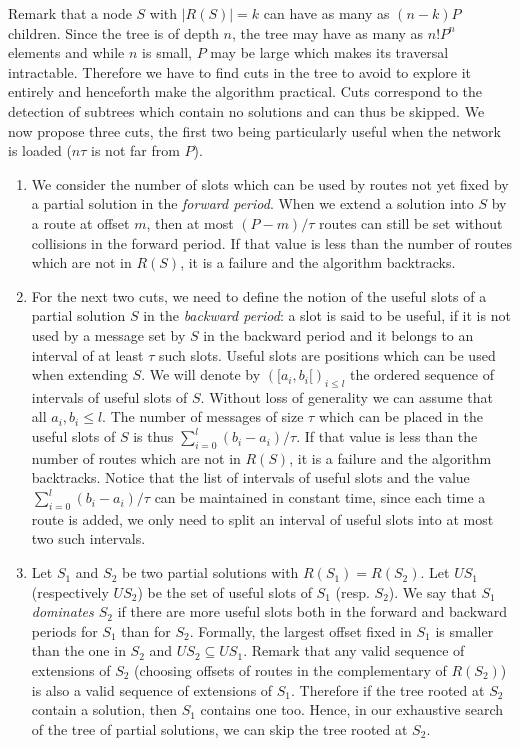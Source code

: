 \documentclass[a4paper,10pt]{article}
\begin{document}
      Remark that a node $S$ with $|R(S)| = k$ can have as many as $(n-k)P$ children. Since the tree is of depth $n$, the tree may have as many as $n!P^n$ elements and while $n$ is small, $P$ may be large which makes its traversal intractable.  Therefore we have to find cuts in the tree to avoid to explore it entirely and henceforth make the algorithm practical. Cuts correspond to the detection of subtrees which contain no solutions and can thus be skipped.   
      We now propose three cuts, the first two being particularly useful when the network is loaded ($n\tau$ is not far from $P$). 
      
      \begin{enumerate}
       \item We consider the number of slots which can be used by routes not yet fixed by a partial solution in the \emph{forward period}. When we extend a solution into $S$ by a route at offset $m$, then at most $(P - m) / \tau $ routes can still be set without collisions in the forward period. If that value is less than the number of routes which are not in $R(S)$, it is a failure and the algorithm backtracks.
       
       \item 
       For the next two cuts, we need to define the notion of the useful slots of a partial solution $S$ in the \emph{backward period}: a slot is said to be useful, if it is not used by a message set by $S$ in the backward period and it belongs to an interval of at least $\tau$ such slots. Useful slots are positions which can be used when extending $S$. We will denote by $([a_i,b_i[)_{i\leq l}$ the ordered sequence of intervals of useful slots of $S$. Without loss of generality we can assume that all $a_i, b_i \leq l$. The number of messages of size $\tau$ which can be placed in the useful slots of $S$ is thus  $\displaystyle{ \sum_{i=0}^{l} (b_{i} -a_i)/\tau } $. If that value is less than the number of routes which are not in $R(S)$, it is a failure and the algorithm backtracks. Notice that the list of intervals of useful slots and the value $\displaystyle{ \sum_{i=0}^{l} (b_{i} -a_i)/\tau } $ can be maintained in constant time, since each time a route is added, we only need to split an interval of useful slots into at most two such intervals.
       
       
       \item 
       Let $S_1$ and $S_2$ be two partial solutions with $R(S_1) = R(S_2)$. Let $US_1$ (respectively $US_2$) be the set of useful slots of $S_1$ (resp. $S_2$). We say that \emph{$S_1$ dominates $S_2$} if there are more useful slots both in the forward and backward periods for $S_1$ than for $S_2$. Formally, the largest offset fixed in $S_1$ is smaller than the one in $S_2$ and $US_2 \subseteq US_1$. Remark that any valid sequence of extensions of $S_2$ (choosing offsets of routes in the complementary of $R(S_2)$) is also a valid sequence of extensions of $S_1$. Therefore if the tree rooted at $S_2$ contain a solution, then $S_1$ contains one too. Hence, in our exhaustive search of the tree of partial solutions, we can skip the tree rooted at $S_2$.
       

\end{enumerate}
\end{document}
